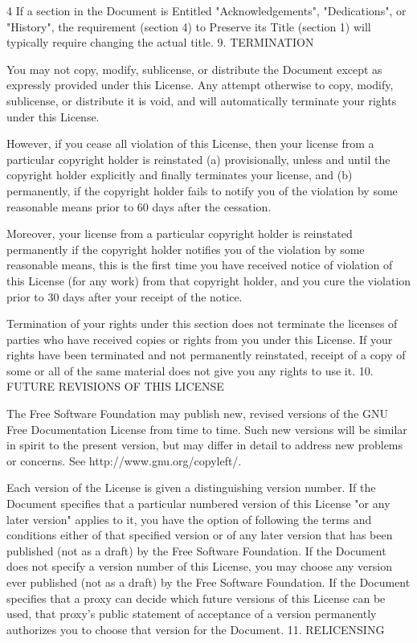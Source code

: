 \documentclass[fontsize=11pt,paper=A4,BCOR=12mm,DIV=13,open=any,listof=totoc,toc=flat]{scrbook}
\begin{document}
{\begin{multicols}{4}
If a section in the Document is Entitled "Acknowledgements", "Dedications", or "History", the requirement (section 4) to Preserve its Title (section 1) will typically require changing the actual title.
9. TERMINATION

You may not copy, modify, sublicense, or distribute the Document except as expressly provided under this License. Any attempt otherwise to copy, modify, sublicense, or distribute it is void, and will automatically terminate your rights under this License.

However, if you cease all violation of this License, then your license from a particular copyright holder is reinstated (a) provisionally, unless and until the copyright holder explicitly and finally terminates your license, and (b) permanently, if the copyright holder fails to notify you of the violation by some reasonable means prior to 60 days after the cessation.

Moreover, your license from a particular copyright holder is reinstated permanently if the copyright holder notifies you of the violation by some reasonable means, this is the first time you have received notice of violation of this License (for any work) from that copyright holder, and you cure the violation prior to 30 days after your receipt of the notice.

Termination of your rights under this section does not terminate the licenses of parties who have received copies or rights from you under this License. If your rights have been terminated and not permanently reinstated, receipt of a copy of some or all of the same material does not give you any rights to use it.
10. FUTURE REVISIONS OF THIS LICENSE

The Free Software Foundation may publish new, revised versions of the GNU Free Documentation License from time to time. Such new versions will be similar in spirit to the present version, but may differ in detail to address new problems or concerns. See http://www.gnu.org/copyleft/.

Each version of the License is given a distinguishing version number. If the Document specifies that a particular numbered version of this License "or any later version" applies to it, you have the option of following the terms and conditions either of that specified version or of any later version that has been published (not as a draft) by the Free Software Foundation. If the Document does not specify a version number of this License, you may choose any version ever published (not as a draft) by the Free Software Foundation. If the Document specifies that a proxy can decide which future versions of this License can be used, that proxy's public statement of acceptance of a version permanently authorizes you to choose that version for the Document.
11. RELICENSING


\end{multicols}}
\end{document}
